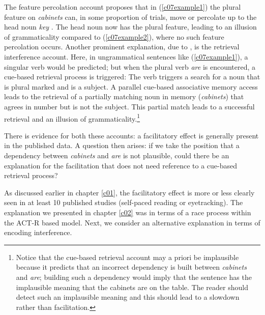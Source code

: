 \documentclass{cambridge7A}\usepackage[]{graphicx}\usepackage[]{color}
\begin{document}
The  feature percolation account proposes that in (\ref{c07example1}) the plural feature on \textit{cabinets} can, in some proportion of trials, move or percolate up to the head noun \textit{key}  \citep[see][for recent evidence for this model]{patson2016misinterpretations}. The head noun now has the plural feature, leading to an illusion of grammaticality compared to (\ref{c07example2}), where no such feature percolation occurs. 
Another prominent explanation, due to \cite{WagersLauPhillips2009}, is the  retrieval interference account. Here, in ungrammatical sentences like (\ref{c07example1}), a singular verb would be predicted; but when the plural verb \textit{are} is encountered, a cue-based retrieval process is triggered: The verb triggers a search for a noun that is plural marked and is a subject. A parallel cue-based associative memory access leads to the retrieval of a partially matching noun in memory (\textit{cabinets}) that agrees in number but is not the subject. This partial match leads to a successful retrieval and an illusion of grammaticality.\footnote{Notice that the cue-based retrieval account may a priori be implausible because it predicts that an incorrect dependency is built between \textit{cabinets} and \textit{are}; building such a dependency would imply that the sentence has the implausible meaning that the cabinets are on the table. The reader should detect such an implausible meaning and this should lead to a slowdown rather than facilitation.} 

There is evidence for both these accounts: a  facilitatory effect is generally present in the published data. 
A question then arises: if we take the position that a dependency between \textit{cabinets} and \textit{are} is not plausible, could there be an explanation for the facilitation that does not need reference to a cue-based retrieval process?

As discussed earlier in chapter \ref{c01}, the facilitatory effect is more or less clearly seen in at least 10 published studies   (self-paced reading or eyetracking). The explanation we presented in chapter \ref{c02} was in terms of a race process within the  ACT-R based model. Next, we consider an alternative explanation in terms of  encoding interference.
\end{document}
